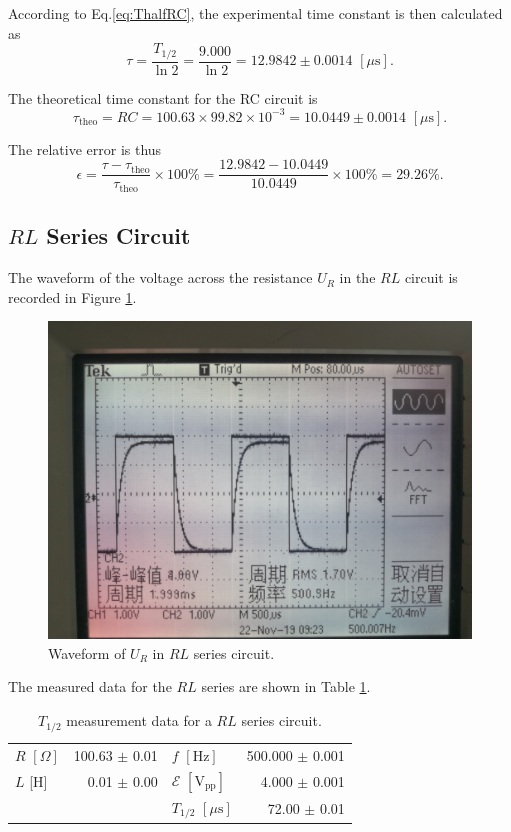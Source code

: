 \documentclass{article}
\begin{document}
According to Eq.\eqref{eq:ThalfRC}, the experimental time constant is then calculated as
$$\tau = \frac{T_{1/2}}{\ln 2} = \frac{9.000}{\ln 2} = 12.9842\pm 0.0014 \,\,[\mu\text{s}].$$

The theoretical time constant for the RC circuit is
$$\tau_{\text{theo}} = RC = 100.63 \times 99.82 \times 10^{-3} = 10.0449 \pm 0.0014 \,\,[\mu\text{s}].$$

The relative error is thus
$$\epsilon = \frac{\tau-\tau_{\text{theo}}}{\tau_{\text{theo}}} \times 100\% = \frac{12.9842 - 10.0449}{10.0449} \times 100\% = 29.26\%.$$

\subsection{$RL$ Series Circuit}

The waveform of the voltage across the resistance $U_R$ in the $RL$ circuit is recorded in Figure \ref{FigRLL}.
\begin{figure}[H]\centering
    \includegraphics[scale=0.06]{2.jpg}
    \caption{Waveform of $U_R$ in $RL$ series circuit.}\label{FigRLL}
\end{figure}

The measured data for the $RL$ series are shown in Table \ref{TableRL}.

\begin{table}[H]
    \centering
    \begin{tabular}{lr|lr}
        \toprule
        $R\,\,[\Omega]$ & 100.63 $\pm$ 0.01 & $f\,\,[\text{Hz}]$                      & 500.000 $\pm$ 0.001 \\
        $L$ [H]         & 0.01 $\pm$ 0.00   & $\mathcal{E}\,\,[\text{V}_{\text{pp}}]$ & 4.000 $\pm$ 0.001   \\
                        &                   & $T_{1/2}\,\,[\mu\text{s}]$              & 72.00 $\pm$ 0.01    \\
        \bottomrule
    \end{tabular}
    \caption{$T_{1/2}$ measurement data for a $RL$ series circuit.\label{TableRL}}
\end{table}
\end{document}
